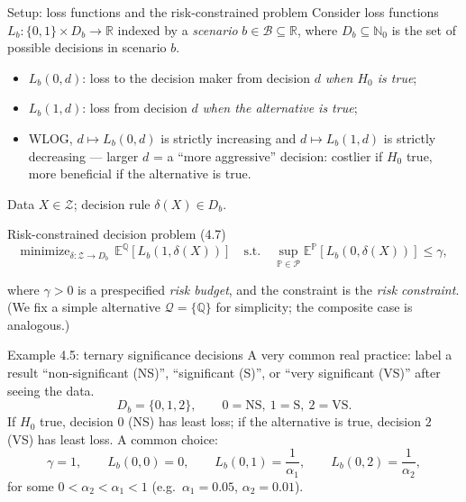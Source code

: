 \documentclass[aspectratio=169,10pt]{beamer}
\begin{document}
\begin{frame}[allowframebreaks]{Setup: loss functions and the risk-constrained problem}
  Consider loss functions $L_b:\{0,1\}\times D_b\to\mathbb R$ indexed by a
  \emph{scenario} $b\in\mathcal B\subseteq\mathbb R$, where $D_b\subseteq\mathbb N_0$
  is the set of possible decisions in scenario $b$.
  \begin{itemize}
    \item $L_b(0,d)$: loss to the decision maker from decision $d$
    \emph{when $H_0$ is true};
    \item $L_b(1,d)$: loss from decision $d$ \emph{when the alternative is true};
    \item WLOG, $d\mapsto L_b(0,d)$ is strictly increasing and
    $d\mapsto L_b(1,d)$ is strictly decreasing --- larger $d$ = a ``more
    aggressive'' decision: costlier if $H_0$ true, more beneficial if the
    alternative is true.
  \end{itemize}
  Data $X\in\mathcal Z$; decision rule $\delta(X)\in D_b$.

  \begin{block}{Risk-constrained decision problem (4.7)}
    \[
      \text{minimize}_{\delta:\mathcal Z\to D_b}\ \ \mathbb E^{\mathbb Q}[L_b(1,\delta(X))]
      \quad\text{s.t.}\quad
      \sup_{\mathbb P\in\mathcal P}\mathbb E^{\mathbb P}[L_b(0,\delta(X))]\le\gamma,
    \]
  \end{block}
  where $\gamma>0$ is a prespecified \emph{risk budget}, and the constraint
  is the \emph{risk constraint}. (We fix a simple alternative
  $\mathcal Q=\{\mathbb Q\}$ for simplicity; the composite case is analogous.)
\end{frame}

\begin{frame}{Example 4.5: ternary significance decisions}
  A very common real practice: label a result ``non-significant (NS)'',
  ``significant (S)'', or ``very significant (VS)'' after seeing the data.
  \[
    D_b=\{0,1,2\},\qquad 0=\text{NS},\ 1=\text{S},\ 2=\text{VS}.
  \]
  If $H_0$ true, decision $0$ (NS) has least loss; if the alternative is
  true, decision $2$ (VS) has least loss. A common choice:
  \[
    \gamma=1,\qquad L_b(0,0)=0,\qquad L_b(0,1)=\frac1{\alpha_1},\qquad L_b(0,2)=\frac1{\alpha_2},
  \]
  for some $0<\alpha_2<\alpha_1<1$ (e.g.\ $\alpha_1=0.05$, $\alpha_2=0.01$).
\end{frame}
\end{document}
